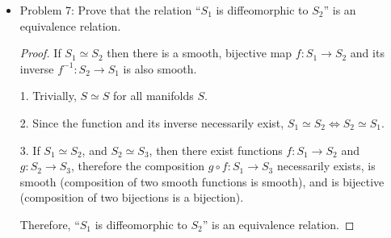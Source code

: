 \documentclass[a4paper,17pt]{extarticle}
\theoremstyle{definition}
\renewcommand{\skip}{\par\null\par}
\begin{document}
\begin{itemize}
\begin{proof}
    \skip\begin{align*}
        g_1^{-1}\circ\phi\circ f_1 &= g_1^{-1}\circ g_2\circ(g_2^{-1}\circ\phi\circ f_2)\circ f_2^{-1}\circ f_1\\
        &=G\circ(g_2^{-1}\circ\phi\circ f_2)\circ F
    \end{align*}
    and
    \begin{align*}
        g_2^{-1}\circ\phi\circ f_2 &= g_2^{-1}\circ g_1\circ(g_1^{-1}\circ\phi\circ f_1)\circ f_1^{-1}\circ f_2\\
        &=G^{-1}\circ(g_1^{-1}\circ\phi\circ f_1)\circ F^{-1}
    \end{align*}
    The maps $G$ and $F$ are diffemorphisms, therefore they are smooth, so this composition must be smooth. Therefore we have shown if $g_1^{-1}\circ\phi\circ f_1$ is smooth, then $g_2^{-1}\circ\phi\circ f_2$ is smooth. Therefore the choice of $f_1$ and $g_1$ or $f_2$ and $g_2$ does not matter.
    \end{proof}
    \item Problem 7: Prove that the relation ``$S_1$ is diffeomorphic to $S_2$'' is an equivalence relation.\begin{proof} If $S_1\simeq S_2$ then there is a smooth, bijective map $f:S_1\to S_2$ and its inverse $f^{-1}:S_2\to S_1$ is also smooth.\skip 1. Trivially, $S\simeq S$ for all manifolds $S$.
    \skip 2. Since the function and its inverse necessarily exist, $S_1\simeq S_2\iff S_2\simeq S_1$.
    \skip 3. If $S_1\simeq S_2$, and $S_2\simeq S_3$, then there exist functions $f:S_1\to S_2$ and $g:S_2\to S_3$, therefore the composition $g\circ f:S_1\to S_3$ necessarily exists, is smooth (composition of two smooth functions is smooth), and is bijective (composition of two bijections is a bijection).\skip Therefore, ``$S_1$ is diffeomorphic to $S_2$'' is an equivalence relation.
    \end{proof}
\end{itemize}
\end{document}
